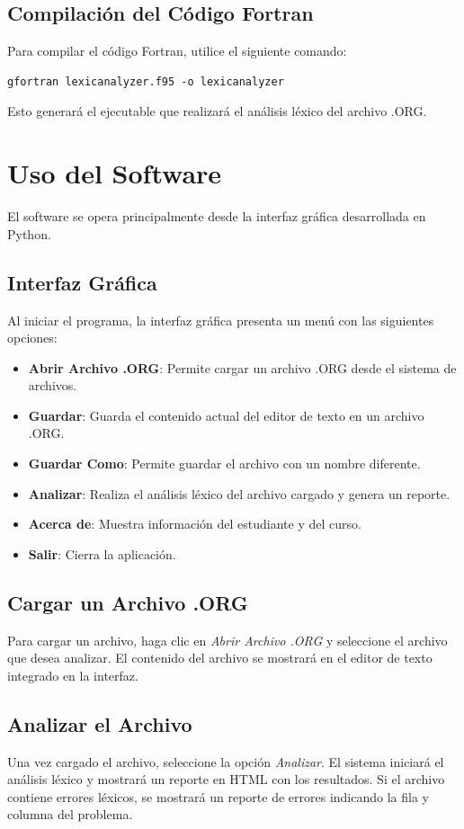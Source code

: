 \documentclass[12pt, letterpaper, twosite]{article}
\begin{document}
\subsection{Compilación del Código Fortran}
Para compilar el código Fortran, utilice el siguiente comando:

\begin{verbatim}
gfortran lexicanalyzer.f95 -o lexicanalyzer
\end{verbatim}

Esto generará el ejecutable que realizará el análisis léxico del archivo .ORG.

\section{Uso del Software}
El software se opera principalmente desde la interfaz gráfica desarrollada en Python.

\subsection{Interfaz Gráfica}
Al iniciar el programa, la interfaz gráfica presenta un menú con las siguientes opciones:
\begin{itemize}
    \item \textbf{Abrir Archivo .ORG}: Permite cargar un archivo .ORG desde el sistema de archivos.
    \item \textbf{Guardar}: Guarda el contenido actual del editor de texto en un archivo .ORG.
    \item \textbf{Guardar Como}: Permite guardar el archivo con un nombre diferente.
    \item \textbf{Analizar}: Realiza el análisis léxico del archivo cargado y genera un reporte.
    \item \textbf{Acerca de}: Muestra información del estudiante y del curso.
    \item \textbf{Salir}: Cierra la aplicación.
\end{itemize}

\subsection{Cargar un Archivo .ORG}
Para cargar un archivo, haga clic en \textit{Abrir Archivo .ORG} y seleccione el archivo que desea analizar. El contenido del archivo se mostrará en el editor de texto integrado en la interfaz.

\subsection{Analizar el Archivo}
Una vez cargado el archivo, seleccione la opción \textit{Analizar}. El sistema iniciará el análisis léxico y mostrará un reporte en HTML con los resultados. Si el archivo contiene errores léxicos, se mostrará un reporte de errores indicando la fila y columna del problema.
\end{document}
